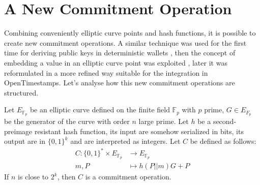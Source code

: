 \section{A New Commitment Operation}

Combining conveniently elliptic curve points and hash functions, it is possible to create new commitment operations.
A similar technique was used for the first time for deriving public keys in deterministic wallets \cite{Max11},
then the concept of embedding a value in an elliptic curve point was exploited \cite{journals/corr/abs-1212-3257, Sidechain},
later it was reformulated in a more refined way \cite{PoePR, PoeIs}
suitable for the integration in OpenTimestamps.
Let's analyse how this new commitment operations are structured.

\begin{myprop}
	Let $E_{\mathbb{F}_p}$ be an elliptic curve defined on the finite field $\mathbb{F}_p$ with $p$ prime, $G \in E_{F_p}$ be the generator of the curve with order $n$ large prime. Let $h$ be a second-preimage resistant hash function, its input are somehow serialized in bits, its output are in $\{0,1\}^k$ and are interpreted as integers.
	Let $C$ be defined as follows:
	\begin{equation}
	\begin{split}
	C : \{0,1\}^* \times E_{\mathbb{F}_p}  & \rightarrow E_{\mathbb{F}_p} \\
	    m, P & \mapsto h(P||m)G + P
	\end{split}
	\end{equation}
	If $n$ is close to $2^k$, then $C$ is a commitment operation.
\end{myprop}
